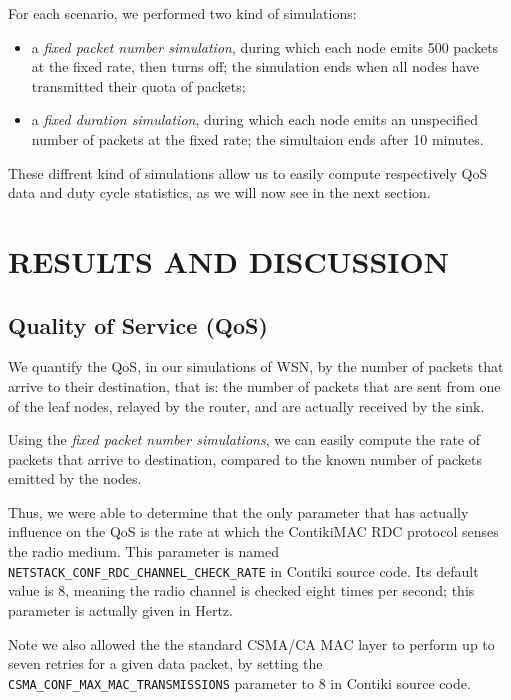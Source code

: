 \documentclass[a4paper,twoside]{article}
\begin{document}
For each scenario, we performed two kind of simulations:
\begin{itemize}
\item a \emph{fixed packet number simulation}, during which each node emits
500 packets at the fixed rate, then turns off; the simulation ends when all
nodes have transmitted their quota of packets;

\item a \emph{fixed duration simulation}, during which each node emits an
unspecified number of packets at the fixed rate; the simultaion ends after
10 minutes.
\end{itemize}

These diffrent kind of simulations allow us to easily compute respectively
QoS data and duty cycle statistics, as we will now see in the next section.



\section{\uppercase{Results and Discussion}}

\subsection{Quality of Service (QoS)}

We quantify the QoS, in our simulations of WSN, by the number of packets
that arrive to their destination, that is: the number of packets that are
sent from one of the leaf nodes, relayed by the router, and are actually
received by the sink.

Using the \emph{fixed packet number simulations}, we can easily compute the
rate of packets that arrive to destination, compared to the known number
of packets emitted by the nodes.

Thus, we were able to determine that the only parameter that has actually
influence on the QoS is the rate at which the ContikiMAC RDC protocol
senses the radio medium. This parameter is named
\texttt{NETSTACK\_CONF\_RDC\_CHANNEL\_CHECK\_RATE} in Contiki source code.
Its default value is 8, meaning the radio channel is checked eight times
per second; this parameter is actually given in Hertz.

Note we also allowed the the standard CSMA/CA MAC layer to perform up to
seven retries for a given data packet, by setting the
\texttt{CSMA\_CONF\_MAX\_MAC\_TRANSMISSIONS}
parameter to 8 in Contiki source code.
\end{document}
